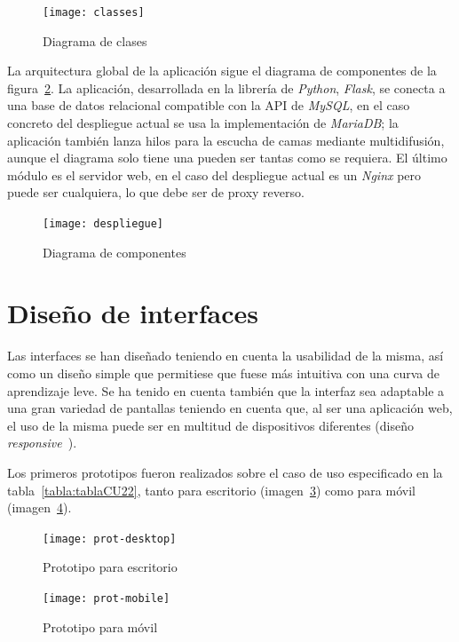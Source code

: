 \begin{figure}
	\centering
	\texttt{[image: classes]}
	\caption{Diagrama de clases}
	\label{fig:classes}
\end{figure}

La arquitectura global de la aplicación sigue el diagrama de componentes de la figura~\ref{fig:despl}. La aplicación, desarrollada en la librería de \textit{Python}, \textit{Flask}, se conecta a una base de datos relacional compatible con la API de \textit{MySQL}, en el caso concreto del despliegue actual se usa la implementación de \textit{MariaDB}; la aplicación también lanza hilos para la escucha de camas mediante multidifusión, aunque el diagrama solo tiene una pueden ser tantas como se requiera. El último módulo es el servidor web, en el caso del despliegue actual es un \textit{Nginx} pero puede ser cualquiera, lo que debe ser de proxy reverso.

\begin{figure}
	\centering
	\texttt{[image: despliegue]}
	\caption{Diagrama de componentes}
	\label{fig:despl}
\end{figure}

\section{Diseño de interfaces}

Las interfaces se han diseñado teniendo en cuenta la usabilidad de la misma, así como un diseño simple que permitiese que fuese más intuitiva con una curva de aprendizaje leve. Se ha tenido en cuenta también que la interfaz sea adaptable a una gran variedad de pantallas teniendo en cuenta que, al ser una aplicación web, el uso de la misma puede ser en multitud de dispositivos diferentes (diseño \textit{responsive}~\cite{wiki:responsive}).

Los primeros prototipos fueron realizados sobre el caso de uso especificado en la tabla~\ref{tabla:tablaCU22}, tanto para escritorio (imagen~\ref{fig:proto-desk}) como para móvil (imagen~\ref{fig:proto-mob}).

\begin{figure}[h]
	\centering
	\texttt{[image: prot-desktop]}
	\caption{Prototipo para escritorio}
	\label{fig:proto-desk}
\end{figure}

\begin{figure}[h]
	\centering
	\texttt{[image: prot-mobile]}
	\caption{Prototipo para móvil}
	\label{fig:proto-mob}
\end{figure}
